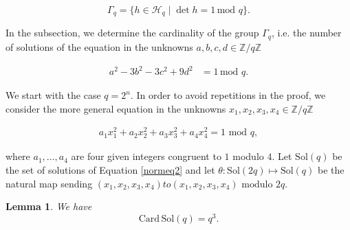 \documentclass[12pt]{amsart}
\newcommand{\Z}{\mathbb{Z}}
\newcommand{\Card}{\mathrm{Card\,}}
\newcommand{\Sol}{{\mathrm {Sol}}}
\renewcommand{\mod}{\,\mathrm{mod}\,}
\newtheorem{lemma}{Lemma}
\newcommand{\cH}{\mathcal{H}}
\begin{document}
$$\Gamma_q=\{h\in\cH_q\mid \det h=1\mod\,q\}.$$

\noindent In the subsection, we determine the cardinality of the group $\Gamma_q$, i.e. 
the number of solutions of the equation in the unknowns
$a, b, c, d\in \Z/q\Z$

\begin{align}
a^2-3b^2-3c^2+9d^2&=1 \mod\, q.\label{normeq}
\end{align}




We start with the  case $q=2^n$. In order to avoid
repetitions in the proof, we consider 
the more general equation in the unknowns
$x_1, x_2, x_3, x_4\in \Z/q\Z$

\begin{align}
a_1x_1^2+a_2x_2^2+a_3x_3^2+a_4x_4^2=1\,\mod\,q,\label{normeq2}
\end{align}


\noindent where $a_1,\ldots, a_4$ are four 
given integers congruent to $1$ modulo $4$.
Let $\Sol(q)$ be the set of solutions of Equation \ref{normeq2}
and let $\theta:\Sol(2q)\mapsto \Sol(q)$ be the natural map
sending $(x_1,x_2,x_3,x_4) to (x_1,x_2,x_3,x_4) \text{ modulo } 2q$.




\begin{lemma} \label{sol2} We have
$$\Card\Sol(q)=q^3.$$
\end{lemma}
\end{document}
